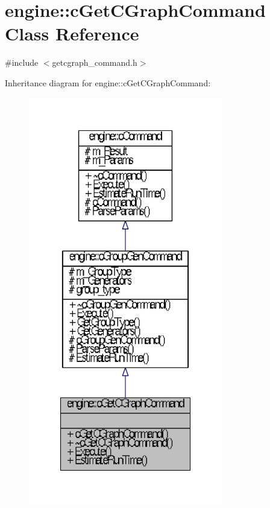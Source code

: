 \hypertarget{classengine_1_1cGetCGraphCommand}{\section{engine\-:\-:c\-Get\-C\-Graph\-Command \-Class \-Reference}
\label{classengine_1_1cGetCGraphCommand}
}


{\ttfamily \#include $<$getcgraph\-\_\-command.\-h$>$}



\-Inheritance diagram for engine\-:\-:c\-Get\-C\-Graph\-Command\-:
\nopagebreak
\begin{figure}[H]
\begin{center}
\leavevmode
\includegraphics[width=240pt]{classengine_1_1cGetCGraphCommand__inherit__graph}
\end{center}
\end{figure}


